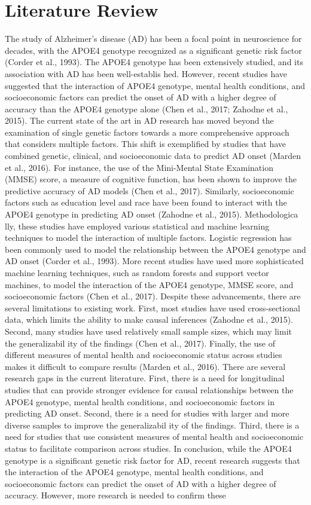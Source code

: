 \documentclass[conference]{IEEEtran}
\begin{document}
\section{Literature Review}
The study of Alzheimer's disease (AD) has been a focal point in neuroscience for decades, with the APOE4 genotype recognized as a significant genetic risk factor (Corder et al., 1993). The APOE4 genotype has been extensively studied, and its association with AD has been well-establis hed. However, recent studies have suggested that the interaction of APOE4 genotype, mental health conditions, and socioeconomic factors can predict the onset of AD with a higher degree of accuracy than the APOE4 genotype alone (Chen et al., 2017; Zahodne et al., 2015). The current state of the art in AD research has moved beyond the examination of single genetic factors towards a more comprehensive approach that considers multiple factors. This shift is exemplified by studies that have combined genetic, clinical, and socioeconomic data to predict AD onset (Marden et al., 2016). For instance, the use of the Mini-Mental State Examination (MMSE) score, a measure of cognitive function, has been shown to improve the predictive accuracy of AD models (Chen et al., 2017). Similarly, socioeconomic factors such as education level and race have been found to interact with the APOE4 genotype in predicting AD onset (Zahodne et al., 2015). Methodologica lly, these studies have employed various statistical and machine learning techniques to model the interaction of multiple factors. Logistic regression has been commonly used to model the relationship between the APOE4 genotype and AD onset (Corder et al., 1993). More recent studies have used more sophisticated machine learning techniques, such as random forests and support vector machines, to model the interaction of the APOE4 genotype, MMSE score, and socioeconomic factors (Chen et al., 2017). Despite these advancements, there are several limitations to existing work. First, most studies have used cross-sectional data, which limits the ability to make causal inferences (Zahodne et al., 2015). Second, many studies have used relatively small sample sizes, which may limit the generalizabil ity of the findings (Chen et al., 2017). Finally, the use of different measures of mental health and socioeconomic status across studies makes it difficult to compare results (Marden et al., 2016). There are several research gaps in the current literature. First, there is a need for longitudinal studies that can provide stronger evidence for causal relationships between the APOE4 genotype, mental health conditions, and socioeconomic factors in predicting AD onset. Second, there is a need for studies with larger and more diverse samples to improve the generalizabil ity of the findings. Third, there is a need for studies that use consistent measures of mental health and socioeconomic status to facilitate comparison across studies. In conclusion, while the APOE4 genotype is a significant genetic risk factor for AD, recent research suggests that the interaction of the APOE4 genotype, mental health conditions, and socioeconomic factors can predict the onset of AD with a higher degree of accuracy. However, more research is needed to confirm these 
\end{document}
